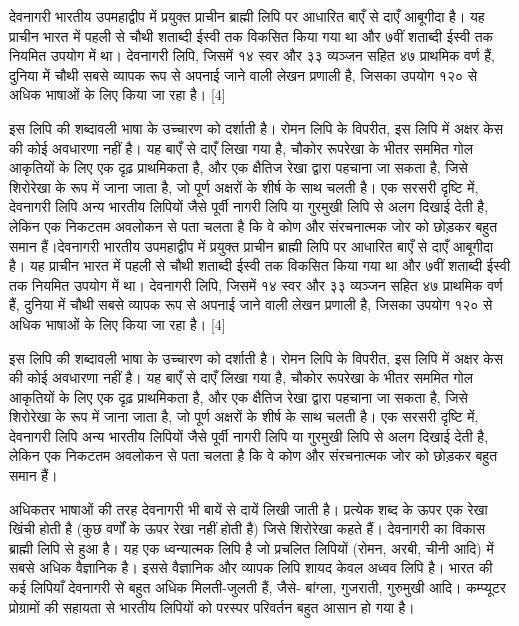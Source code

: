 \documentclass[a4paper,12pt,oneside,final]{article}
\begin{document}
देवनागरी भारतीय उपमहाद्वीप में प्रयुक्त प्राचीन ब्राह्मी लिपि पर आधारित बाएँ से दाएँ आबूगीदा है। यह प्राचीन भारत में पहली से चौथी शताब्दी ईस्वी तक विकसित किया गया था और ७वीं शताब्दी ईस्वी तक नियमित उपयोग में था। देवनागरी लिपि, जिसमें १४ स्वर और ३३ व्यञ्जन सहित ४७ प्राथमिक वर्ण हैं, दुनिया में चौथी सबसे व्यापक रूप से अपनाई जाने वाली लेखन प्रणाली है, जिसका उपयोग १२० से अधिक भाषाओं के लिए किया जा रहा है। [4]

इस लिपि की शब्दावली भाषा के उच्चारण को दर्शाती है। रोमन लिपि के विपरीत, इस लिपि में अक्षर केस की कोई अवधारणा नहीं है। यह बाएँ से दाएँ लिखा गया है, चौकोर रूपरेखा के भीतर सममित गोल आकृतियों के लिए एक दृढ़ प्राथमिकता है, और एक क्षैतिज रेखा द्वारा पहचाना जा सकता है, जिसे शिरोरेखा के रूप में जाना जाता है, जो पूर्ण अक्षरों के शीर्ष के साथ चलती है। एक सरसरी दृष्टि में, देवनागरी लिपि अन्य भारतीय लिपियों जैसे पूर्वी नागरी लिपि या गुरमुखी लिपि से अलग दिखाई देती है, लेकिन एक निकटतम अवलोकन से पता चलता है कि वे कोण और संरचनात्मक जोर को छोड़कर बहुत समान हैं।देवनागरी भारतीय उपमहाद्वीप में प्रयुक्त प्राचीन ब्राह्मी लिपि पर आधारित बाएँ से दाएँ आबूगीदा है। यह प्राचीन भारत में पहली से चौथी शताब्दी ईस्वी तक विकसित किया गया था और ७वीं शताब्दी ईस्वी तक नियमित उपयोग में था। देवनागरी लिपि, जिसमें १४ स्वर और ३३ व्यञ्जन सहित ४७ प्राथमिक वर्ण हैं, दुनिया में चौथी सबसे व्यापक रूप से अपनाई जाने वाली लेखन प्रणाली है, जिसका उपयोग १२० से अधिक भाषाओं के लिए किया जा रहा है। [4]

इस लिपि की शब्दावली भाषा के उच्चारण को दर्शाती है। रोमन लिपि के विपरीत, इस लिपि में अक्षर केस की कोई अवधारणा नहीं है। यह बाएँ से दाएँ लिखा गया है, चौकोर रूपरेखा के भीतर सममित गोल आकृतियों के लिए एक दृढ़ प्राथमिकता है, और एक क्षैतिज रेखा द्वारा पहचाना जा सकता है, जिसे शिरोरेखा के रूप में जाना जाता है, जो पूर्ण अक्षरों के शीर्ष के साथ चलती है। एक सरसरी दृष्टि में, देवनागरी लिपि अन्य भारतीय लिपियों जैसे पूर्वी नागरी लिपि या गुरमुखी लिपि से अलग दिखाई देती है, लेकिन एक निकटतम अवलोकन से पता चलता है कि वे कोण और संरचनात्मक जोर को छोड़कर बहुत समान हैं।

अधिकतर भाषाओं की तरह देवनागरी भी बायें से दायें लिखी जाती है। प्रत्येक शब्द के ऊपर एक रेखा खिंची होती है (कुछ वर्णों के ऊपर रेखा नहीं होती है) जिसे शिरोरेखा कहते हैं। देवनागरी का विकास ब्राह्मी लिपि से हुआ है। यह एक ध्वन्यात्मक लिपि है जो प्रचलित लिपियों (रोमन, अरबी, चीनी आदि) में सबसे अधिक वैज्ञानिक है। इससे वैज्ञानिक और व्यापक लिपि शायद केवल अध्वव लिपि है। भारत की कई लिपियाँ देवनागरी से बहुत अधिक मिलती-जुलती हैं, जैसे- बांग्ला, गुजराती, गुरुमुखी आदि। कम्प्यूटर प्रोग्रामों की सहायता से भारतीय लिपियों को परस्पर परिवर्तन बहुत आसान हो गया है।
\end{document}
